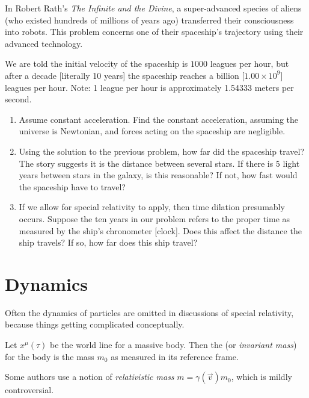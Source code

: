 \begin{exercise}
In Robert Rath's \textit{The Infinite and the Divine}, a super-advanced
species of aliens (who existed hundreds of millions of years ago)
transferred their consciousness into robots. This problem concerns one
of their spaceship's trajectory using their advanced technology.

We are told the initial velocity of the spaceship is $1000$ leagues per
hour, but after a decade [literally 10 years] the spaceship reaches a
billion [$1.00\times10^{9}$] leagues per hour. Note: 1 league per hour
is approximately 1.54333 meters per second.
\begin{enumerate}
\item Assume constant acceleration. Find the constant acceleration,
  assuming the universe is Newtonian, and forces acting on the spaceship
  are negligible.
\item Using the solution to the previous problem, how far did the
  spaceship travel? The story suggests it is the distance between
  several stars. If there is 5 light years between stars in the galaxy,
  is this reasonable? If not, how fast would the spaceship have to
  travel?
\item If we allow for special relativity to apply, then time dilation
  presumably occurs. Suppose the ten years in our problem refers to the
  proper time as measured by the ship's chronometer [clock]. Does this
  affect the distance the ship travels? If so, how far does this ship
  travel?
\end{enumerate}
\end{exercise}

\section{Dynamics}

\M
Often the dynamics of particles are omitted in discussions of special
relativity, because things getting complicated conceptually.

\begin{definition}
Let $x^{\mu}(\tau)$ be the world line for a massive body.
Then the  (or \emph{invariant mass}) for the body is
the mass $m_{0}$ as measured in its reference frame.
\end{definition}

\begin{remark}
Some authors use a notion of \emph{relativistic mass}
$m = \gamma(\vec{v})m_{0}$, which is mildly controversial. 
\end{remark}

